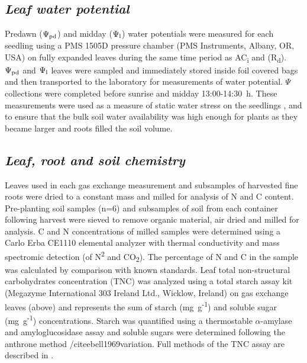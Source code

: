 \documentclass[a4paper]{article}\usepackage[]{graphicx}\usepackage[]{color}
\begin{document}
\subsection*{\textit{Leaf water potential}}
Predawn ($\Psi\textsubscript{pd}$) and midday ($\Psi\textsubscript{l}$) water potentials were measured for each seedling using a PMS 1505D pressure chamber (PMS Instruments, Albany, OR, USA) on fully expanded leaves during the same time period as AC\textsubscript{i} and (R\textsubscript{d}). $\Psi\textsubscript{pd}$ and $\Psi\textsubscript{l}$ leaves were sampled and immediately stored inside foil covered bags and then transported to the laboratory for measurements of water potential. $\Psi$ collections were completed before sunrise and midday 13:00-14:30~h. These measurements were used as a measure of static water stress on the seedlings \cite{sellin1999does}, and to ensure that the bulk soil water availability was high enough for plants as they became larger and roots filled the soil volume. 

\subsection*{\textit{Leaf, root and soil chemistry}}
Leaves used in each gas exchange measurement and subsamples of harvested fine roots were dried to a constant mass and milled for analysis of N and C content. Pre-planting soil samples (n=6) and subsamples of soil from each container following harvest were sieved to remove organic material, air dried and milled for analysis. C and N concentrations of milled samples were determined using a Carlo Erba CE1110 elemental analyzer with thermal conductivity and mass spectromic detection (of N\textsuperscript{2} and CO\textsubscript{2}).  The percentage of N and C in the sample was calculated by comparison with known standards. Leaf total non-structural carbohydrates concentration (TNC) was analyzed using a total starch assay kit (Megazyme International 303 Ireland Ltd., Wicklow, Ireland) on gas exchange leaves (above) and represents the sum of starch (mg~g\textsuperscript{-1}) and soluble sugar (mg~g\textsuperscript{-1}) concentrations. Starch was quantified using a thermostable $\alpha$-amylase and amyloglucosidase assay \cite{MCCLEARY} and soluble sugars were determined following the anthrone method /cite{ebell1969variation}. Full methods of the TNC assay are described in \cite{mitchell2013drought}.
\end{document}
